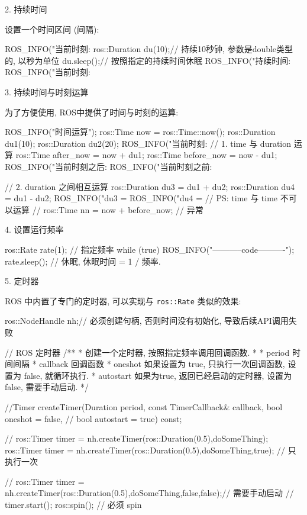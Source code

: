 \documentclass[openany, fontset=windowsold]{ctexbook}
\theoremstyle{kaiti}
\theoremstyle{normal}
\begin{document}
2. 持续时间

设置一个时间区间 (间隔):

\begin{cpp}
  ROS_INFO("当前时刻:%
  ros::Duration du(10);// 持续10秒钟, 参数是double类型的, 以秒为单位
  du.sleep();// 按照指定的持续时间休眠
  ROS_INFO("持续时间:%
  ROS_INFO("当前时刻:%
\end{cpp}

3. 持续时间与时刻运算

为了方便使用, ROS中提供了时间与时刻的运算:

\begin{cpp}
  ROS_INFO("时间运算");
  ros::Time now = ros::Time::now();
  ros::Duration du1(10);
  ros::Duration du2(20);
  ROS_INFO("当前时刻:%
  // 1. time 与 duration 运算
  ros::Time after_now = now + du1;
  ros::Time before_now = now - du1;
  ROS_INFO("当前时刻之后:%
  ROS_INFO("当前时刻之前:%

  // 2. duration 之间相互运算
  ros::Duration du3 = du1 + du2;
  ros::Duration du4 = du1 - du2;
  ROS_INFO("du3 = %
  ROS_INFO("du4 = %
  // PS: time 与 time 不可以运算
  // ros::Time nn = now + before_now; // 异常
\end{cpp}

4. 设置运行频率

\begin{cpp}
  ros::Rate rate(1); // 指定频率
  while (true)
  {
      ROS_INFO("-----------code----------");
      rate.sleep(); // 休眠, 休眠时间 = 1 / 频率.
  }
\end{cpp}

5. 定时器

ROS 中内置了专门的定时器, 可以实现与 \verb|ros::Rate| 类似的效果:

\begin{cpp}
  ros::NodeHandle nh;// 必须创建句柄, 否则时间没有初始化, 导致后续API调用失败

  // ROS 定时器
  /**
   * \brief 创建一个定时器, 按照指定频率调用回调函数.
   *
   * \param period 时间间隔
   * \param callback 回调函数
   * \param oneshot 如果设置为 true, 只执行一次回调函数, 设置为  false, 就循环执行.
   * \param autostart 如果为true, 返回已经启动的定时器, 设置为 false, 需要手动启动.
   */

  //Timer createTimer(Duration period, const TimerCallback& callback, bool oneshot = false,
  //                bool autostart = true) const;

  // ros::Timer timer = nh.createTimer(ros::Duration(0.5),doSomeThing);
  ros::Timer timer = nh.createTimer(ros::Duration(0.5),doSomeThing,true); // 只执行一次

  // ros::Timer timer = nh.createTimer(ros::Duration(0.5),doSomeThing,false,false);// 需要手动启动
  // timer.start();
  ros::spin(); // 必须 spin
\end{cpp}
\end{document}
